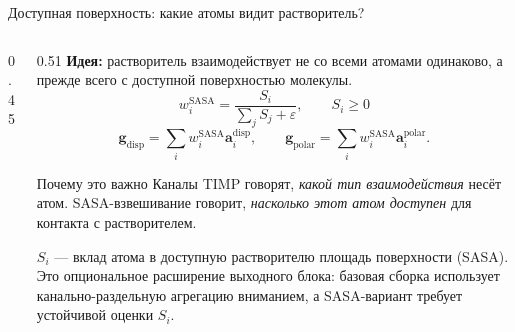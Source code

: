 \documentclass[aspectratio=169,10pt]{beamer}
\newcommand{\smallnote}[1]{{\scriptsize\color{TGSlate}#1}}
\begin{document}
\begin{frame}{Доступная поверхность: какие атомы видит растворитель?}
\begin{columns}[c,onlytextwidth]
\begin{column}{0.45\textwidth}
    \end{column}
    \begin{column}{0.51\textwidth}
      \textbf{Идея:} растворитель взаимодействует не со всеми атомами одинаково,
      а прежде всего с доступной поверхностью молекулы.
      \vspace{0.5em}
      \[
        w_i^{\mathrm{SASA}}
        =
        \frac{S_i}{\sum_j S_j+\varepsilon},
        \qquad
        S_i\ge0
      \]
      \vspace{-0.5em}
      \[
        \mathbf g_{\mathrm{disp}}
        =
        \sum_i w_i^{\mathrm{SASA}}\mathbf a_i^{\mathrm{disp}},
        \qquad
        \mathbf g_{\mathrm{polar}}
        =
        \sum_i w_i^{\mathrm{SASA}}\mathbf a_i^{\mathrm{polar}}.
      \]
      \begin{block}{Почему это важно}
        \scriptsize
        Каналы TIMP говорят, \emph{какой тип взаимодействия} несёт атом.
        SASA-взвешивание говорит, \emph{насколько этот атом доступен} для контакта
        с растворителем.
      \end{block}
      \smallnote{$S_i$ — вклад атома в доступную растворителю площадь поверхности (SASA).
      Это опциональное расширение выходного блока: базовая сборка использует
      канально-раздельную агрегацию вниманием, а SASA-вариант требует устойчивой
      оценки $S_i$.}
    \end{column}
  \end{columns}
\end{frame}
\end{document}
